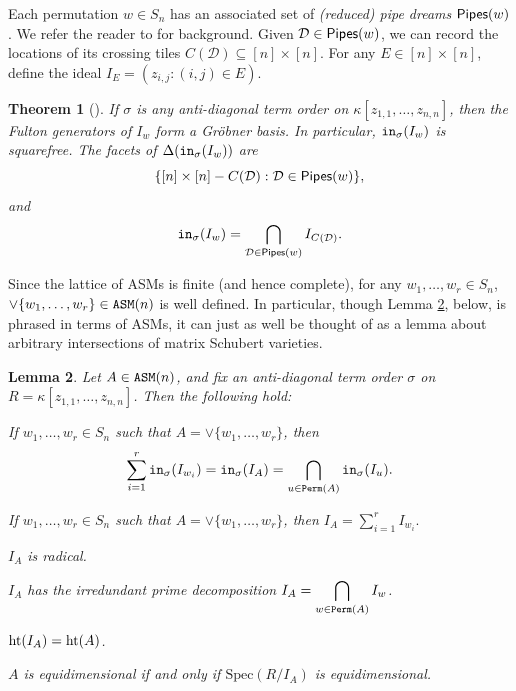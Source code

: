 \documentclass[12pt,reqno]{amsart}
\newtheorem{theorem}{Theorem}[section]
\newtheorem{lemma}[theorem]{Lemma}
\newtheorem{Main Conjecture}[theorem]{Main Conjecture}
\theoremstyle{remark}
\newenvironment{remark}
  {\pushQED{\qed}\renewcommand{\qedsymbol}{$\diamondsuit$}\remarkx}
  {\popQED\endremarkx}
\theoremstyle{plain}
\newcommand{\notdefterm}[1]{\emph{#1}}
\newcommand{\init}{{\tt in}}
\newcommand{\pipes}{{\sf Pipes}}
\newcommand{\hgt}{{\rm{ht }}}
\newcommand{\perm}{{\tt Perm}}
\newcommand{\asm}{{\tt ASM}}
\newcommand{\spec}{{\mbox{Spec}}}
\begin{document}
Each permutation $w\in S_n$ has an associated set of \notdefterm{(reduced) pipe dreams} $\pipes(w)$. We refer the reader to \cite{BB93} for background. Given $\mathcal D\in \pipes(w)$, we can record the locations of its crossing tiles $C(\mathcal D)\subseteq [n]\times [n]$. For any $E \in [n] \times [n]$, define the ideal $I_E = (z_{i,j}:(i,j)\in E)$.


\begin{theorem}[{\cite[Theorem~B]{KM05}}]
\label{theorem:KMTheoremB}
If $\sigma$ is any anti-diagonal term order on $\kappa[z_{1,1}, \ldots, z_{n,n}]$, then the Fulton generators of $I_w$ 
form a Gr\"obner basis.  In particular,  $\init_\sigma(I_w)$ is squarefree.  The facets of $\Delta(\init_\sigma(I_w))$ are \[\{[n]\times[n] - C(\mathcal D):\mathcal D\in \pipes(w)\},\]
and \[\init_\sigma(I_w)=\bigcap_{\mathcal D\in \pipes(w)} I_{C(\mathcal D)}.\]
\end{theorem}

\begin{remark}
Since the lattice of ASMs is finite (and hence complete), for any $w_1,\ldots,w_r\in S_n$,  $\vee\{w_1,\ldots,w_r\}\in \asm(n)$ is well defined.  In particular, though Lemma \ref{lemma:asmIdealFacts}, below, is phrased in terms of ASMs, it can just as well be thought of as a lemma about arbitrary intersections of matrix Schubert varieties.
\end{remark}



\begin{lemma}\label{lemma:asmIdealFacts}
Let $A\in \asm(n)$, and fix an anti-diagonal term order $\sigma$ on $ R = \kappa[z_{1,1},\ldots,z_{n,n}]$.   Then the following hold:
\begin{thmlist}
\item  If $w_1,\ldots,w_r\in S_n$ such that $A=\vee\{w_1,\ldots,w_r\}$, then
\[ \sum_{i=1}^r \init_\sigma(I_{w_i})=\init_\sigma(I_A)=\bigcap_{u\in \perm(A)} \init_\sigma(I_u).\]
\label{lempart:intersectInit}
    

     
    \item If $w_1,\ldots,w_r\in S_n$ such that $A=\vee\{w_1,\ldots,w_r\}$, then $ I_A={\displaystyle \sum_{i=1}^r} I_{w_i}.$ \label{lempart:addIwi}
    
     \item $I_A$ is radical. \label{lempart:asmRad}
    
   \item $I_A$ has the irredundant prime decomposition $\displaystyle I_A=\bigcap_{w\in \perm(A)}I_w$. \label{lempart:asmDecomp}
   
\item $\hgt (I_A)=\hgt(A)$. \label{lempart:asmHeight}

		\item $A$ is equidimensional if and only if $\spec(R/I_A)$ is equidimensional. \label{lempart:asmEquidim}
\end{thmlist}
\end{lemma}
\end{document}
